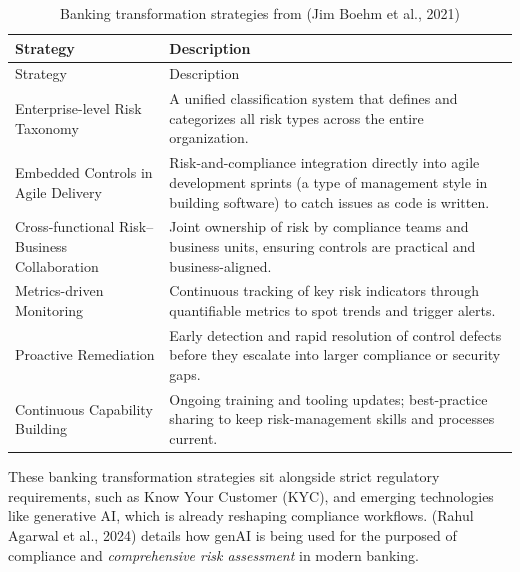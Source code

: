 \documentclass[
  12pt,
  letterpaper,
  DIV=11,
  numbers=noendperiod]{scrartcl}
\begin{document}
\begin{longtable}[]{@{}
  >{\raggedright\arraybackslash}p{}
  >{\raggedright\arraybackslash}p{}@{}}
\caption[Banking Transformation Strategies]{Banking transformation
strategies from (Jim Boehm et al., 2021)}\tabularnewline
\toprule\noalign{}
\begin{minipage}[b]{\linewidth}\raggedright
Strategy
\end{minipage} & \begin{minipage}[b]{\linewidth}\raggedright
Description
\end{minipage} \\
\midrule\noalign{}
\endfirsthead
\toprule\noalign{}
\begin{minipage}[b]{\linewidth}\raggedright
Strategy
\end{minipage} & \begin{minipage}[b]{\linewidth}\raggedright
Description
\end{minipage} \\
\midrule\noalign{}
\endhead
\bottomrule\noalign{}
\endlastfoot
Enterprise-level Risk Taxonomy & A unified classification system that
defines and categorizes all risk types across the entire
organization. \\
Embedded Controls in Agile Delivery & Risk-and-compliance integration
directly into agile development sprints (a type of management style in
building software) to catch issues as code is written. \\
Cross-functional Risk--Business Collaboration & Joint ownership of risk
by compliance teams and business units, ensuring controls are practical
and business-aligned. \\
Metrics-driven Monitoring & Continuous tracking of key risk indicators
through quantifiable metrics to spot trends and trigger alerts. \\
Proactive Remediation & Early detection and rapid resolution of control
defects before they escalate into larger compliance or security gaps. \\
Continuous Capability Building & Ongoing training and tooling updates;
best-practice sharing to keep risk-management skills and processes
current. \\
\end{longtable}

\let\pandoctableshortcapt\relax

These banking transformation strategies sit alongside strict regulatory
requirements, such as Know Your Customer (KYC), and emerging
technologies like generative AI, which is already reshaping compliance
workflows. (Rahul Agarwal et al., 2024) details how genAI is being used
for the purposed of compliance and \emph{comprehensive risk assessment}
in modern banking.
\end{document}
